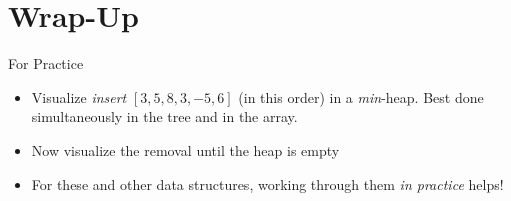 \section{Wrap-Up}
\begin{frame}{For Practice}
    \begin{itemize}[<+(1)->]
        \itemsep7pt
        \item Visualize \textit{insert} \([3, 5, 8, 3, -5, 6]\) (in this order) in a \textit{min}-heap. Best done simultaneously in the tree and in the array.
        \item Now visualize the removal until the heap is empty\bigskip
        \item[\scalebox{.5}{\raisebox{3.66pt}{\paletteA{$\blacksquare$}}}] For these and other data structures, working through them \textit{in practice} helps!
    \end{itemize}
\end{frame}
\SidebarReset


